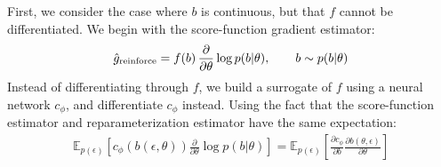 \documentclass{article}
\newcommand{\E}{\mathbb{E}}
\newcommand{\PT}{\frac{\partial}{\partial \theta}}
\newcommand{\YW}[1]{{\color{red} \bf [[YW: #1]]}}
\newcommand{\LAX}{{\textnormal{LAX}}}
\begin{document}

First, we consider the case where $b$ is continuous, but that $f$ cannot be differentiated.
We begin with the score-function gradient estimator:
%
\begin{align}
\hat g_\textnormal{reinforce} = f \! \left( b \right) \PT \log p(b | \theta), \qquad b \sim p(b|\theta)
\end{align}
%
Instead of differentiating through $f$, we build a surrogate of $f$ using a neural network $c_\phi$, and differentiate $c_\phi$ instead.
Using the fact that the score-function estimator and reparameterization estimator have the same expectation:
%
\begin{align}
\E_{p(\epsilon)} \left[ c_\phi ( b(\epsilon, \theta)) \PT \log p(b | \theta) \right] =
\E_{p(\epsilon)} \left[ \frac{\partial c_\phi}{\partial b} \frac{\partial b(\theta, \epsilon)}{\partial \theta} \right]
\end{align}
%
%
%
%
\end{document}
